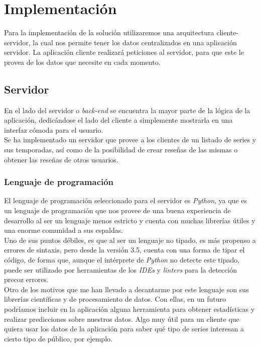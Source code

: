 \chapter{Implementación}\label{chap:implementación}

Para la implementación de la solución utilizaremos una arquitectura cliente-servidor\cite{client-server}, la cual nos
permite tener los datos centralizados en una aplicación servidor. La aplicación cliente realizará peticiones al
servidor, para que este le provea de los datos que necesite en cada momento.\\

\section{Servidor}
En el lado del servidor o \textit{back-end} se encuentra la mayor parte de la lógica de la aplicación, dedicándose el
lado del cliente a simplemente mostrarla en una interfaz cómoda para el usuario.\\

Se ha implementado un servidor que provee a los clientes de un listado de series y sus temporadas, así como de la
posibilidad de crear reseñas de las mismas o obtener las reseñas de otros usuarios.

\subsection{Lenguaje de programación}
El lenguaje de programación seleccionado para el servidor es \textit{Python}\cite{python}, ya que es un lenguaje de
programación que nos provee de una buena experiencia de desarrollo al ser un lenguaje menos estricto y cuenta con muchas
librerías útiles y una enorme comunidad a sus espaldas.\\

Uno de sus puntos débiles, es que al ser un lenguaje no tipado, es más propenso a errores de sintaxis, pero desde la
versión 3.5, cuenta con una forma de tipar el código, de forma que, aunque el intérprete de \textit{Python} no detecte
este tipado, puede ser utilizado por herramientas de los \textit{IDEs} y \textit{linters} para la detección precoz
errores.\\

Otro de los motivos que me han llevado a decantarme por este lenguaje son sus librerías científicas y de procesamiento
de datos. Con ellas, en un futuro podríamos incluir en la aplicación alguna herramienta para obtener estadísticas y
realizar predicciones sobre nuestros datos. Algo muy útil para un cliente que quiera usar los datos de la aplicación
para saber qué tipo de series interesan a cierto tipo de público, por ejemplo.\\

